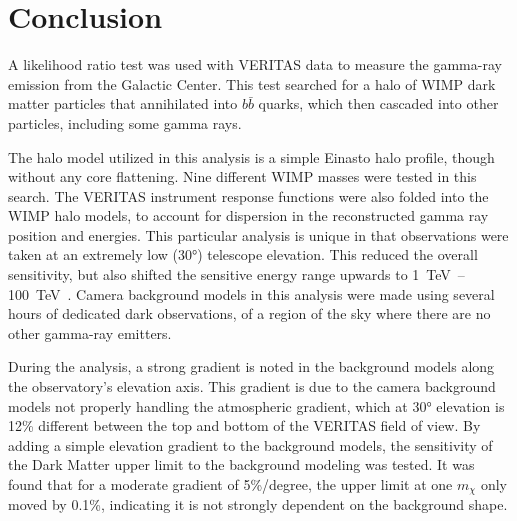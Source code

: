\cleartooddpage[\thispagestyle{empty}]
\chapter{Conclusion}


A likelihood ratio test was used with VERITAS data to measure the gamma-ray emission from the Galactic Center.
This test searched for a halo of WIMP dark matter particles that annihilated into $b\bar{b}$ quarks, which then cascaded into other particles, including some gamma rays.

The halo model utilized in this analysis is a simple Einasto halo profile, though without any core flattening.
Nine different WIMP masses were tested in this search.
The VERITAS instrument response functions were also folded into the WIMP halo models, to account for dispersion in the reconstructed gamma ray position and energies.
This particular analysis is unique in that observations were taken at an extremely low (\nicetilde{}\ang{30}) telescope elevation.
This reduced the overall sensitivity, but also shifted the sensitive energy range upwards to \SIrange{1}{100}{\TeV{}}.
Camera background models in this analysis were made using several hours of dedicated dark observations, of a region of the sky where there are no other gamma-ray emitters.

During the analysis, a strong gradient is noted in the background models along the observatory's elevation axis.
This gradient is due to the camera background models not properly handling the atmospheric gradient, which at \ang{30} elevation is \nicetilde{}12\% different between the top and bottom of the VERITAS field of view.
By adding a simple elevation gradient to the background models, the sensitivity of the Dark Matter upper limit to the background modeling was tested.
It was found that for a moderate gradient of 5\%/degree, the upper limit at one $m_{\chi}$ only moved by 0.1\%, indicating it is not strongly dependent on the background shape.

